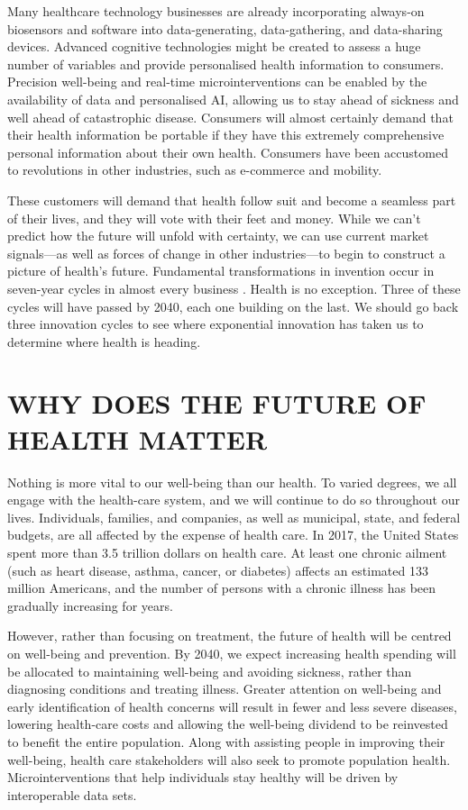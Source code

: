 \documentclass{article}
\begin{document}
    Many healthcare technology businesses are already incorporating always-on biosensors and software into data-generating, data-gathering, and data-sharing devices. Advanced cognitive technologies might be created to assess a huge number of variables and provide personalised health information to consumers. Precision well-being and real-time microinterventions can be enabled by the availability of data and personalised AI, allowing us to stay ahead of sickness and well ahead of catastrophic disease. Consumers will almost certainly demand that their health information be portable if they have this extremely comprehensive personal information about their own health. Consumers have been accustomed to revolutions in other industries, such as e-commerce and mobility.

    These customers will demand that health follow suit and become a seamless part of their lives, and they will vote with their feet and money. While we can't predict how the future will unfold with certainty, we can use current market signals—as well as forces of change in other industries—to begin to construct a picture of health's future. Fundamental transformations in invention occur in seven-year cycles in almost every business . Health is no exception. Three of these cycles will have passed by 2040, each one building on the last. We should go back three innovation cycles to see where exponential innovation has taken us to determine where health is heading.

\section{WHY DOES THE FUTURE OF HEALTH MATTER}

    Nothing is more vital to our well-being than our health. To varied degrees, we all engage with the health-care system, and we will continue to do so throughout our lives. Individuals, families, and companies, as well as municipal, state, and federal budgets, are all affected by the expense of health care. In 2017, the United States spent more than 3.5 trillion dollars on health care. At least one chronic ailment (such as heart disease, asthma, cancer, or diabetes) affects an estimated 133 million Americans, and the number of persons with a chronic illness has been gradually increasing for years.

      However, rather than focusing on treatment, the future of health will be centred on well-being and prevention. By 2040, we expect increasing health spending will be allocated to maintaining well-being and avoiding sickness, rather than diagnosing conditions and treating illness. Greater attention on well-being and early identification of health concerns will result in fewer and less severe diseases, lowering health-care costs and allowing the well-being dividend to be reinvested to benefit the entire population. Along with assisting people in improving their well-being, health care stakeholders will also seek to promote population health. Microinterventions that help individuals stay healthy will be driven by interoperable data sets.
\end{document}
